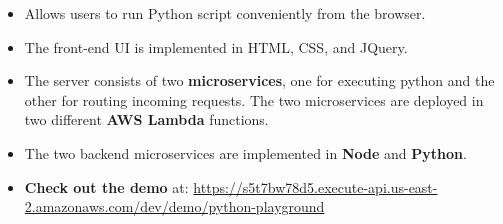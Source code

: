 \documentclass{resume}
\begin{document}
\begin{itemize}
	\item Allows users to run Python script conveniently from the browser. 
	\item The front-end UI is implemented in HTML, CSS, and JQuery.
	\item The server consists of two \textbf{microservices}, one for executing python and the other for routing incoming requests. The two microservices are deployed in two different \textbf{AWS Lambda} functions.
	\item The two backend microservices are implemented in \textbf{Node} and \textbf{Python}.
	\item \textbf{Check out the demo} at: \url{https://s5t7bw78d5.execute-api.us-east-2.amazonaws.com/dev/demo/python-playground}  
\end{itemize}

\iffalse
\datedsubsection{Document File Search Engine}{Mar. 2018}
\begin{itemize}
	\item Implemented document parser using Tika to parse documents in given directories and stored contents and metadata into Mongodb.
	\item Developed document analyzer in \textbf{Java} using Lucene to index and score the stored documents given a query string.
	\item Implemented RESTful APIs using \textbf{Spring Boot} to provide search results.
\end{itemize}
\fi

\iffalse
\datedsubsection{Unix Log Analyzer Web App}{Mar. 2018}
\begin{itemize}
	\item Implemented the RESTful server using Node and MongoDB which allows users to upload and store Unix-like OS logs.
	\item Designed and implemented interactive React UI components for users to query and visualize logs. 
\end{itemize}
\fi

\iffalse
\section{\faInfo\ Extra-curricular}
\datedline{CSearch Conference}{Oct. 2020}
\begin{itemize}
	\item Invited to attended Computing Student Research Conference (CSearch) 2020.
	\item Delivered Poster presentation on application of graph attention networks to link prediction problems.
\end{itemize}
\fi
%
%
\end{document}
